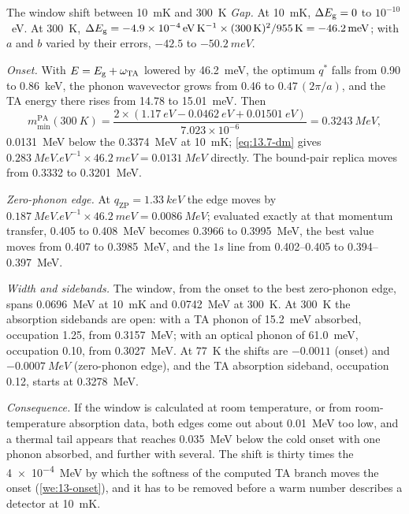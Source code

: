 \begin{workedexample}{The window shift between \SI{10}{mK} and \SI{300}{K}}\label{we:13-windowT}
\emph{Gap.} At \SI{10}{mK}, $\Delta E_{\mathrm{g}} = 0$ to $10^{-10}$~eV. At \SI{300}{K}, $\Delta E_{\mathrm{g}} = -\SI{4.9e-4}{eV.K^{-1}}\times(\SI{300}{K})^2/\SI{955}{K} = -\SI{46.2}{meV}$; with $a$ and $b$ varied by their errors, $-42.5$ to $-\SI{50.2}{meV}$.

\emph{Onset.} With $E = E_{\mathrm{g}} + \omega_{\mathrm{TA}}$ lowered by \SI{46.2}{meV}, the optimum $q^*$ falls from 0.90 to \SI{0.86}{keV}, the phonon wavevector grows from 0.46 to $0.47\,(2\pi/a)$, and the TA energy there rises from 14.78 to \SI{15.01}{meV}. Then
\begin{equation*}
  m_{\mathrm{min}}^{\mathrm{PA}}(\SI{300}{K}) = \frac{2\times(\SI{1.17}{eV} - \SI{0.0462}{eV} + \SI{0.01501}{eV})}{7.023\times10^{-6}} = \SI{0.3243}{MeV} ,
\end{equation*}
\SI{0.0131}{MeV} below the \SI{0.3374}{MeV} at \SI{10}{mK}; \cref{eq:13.7-dm} gives $\SI{0.283}{MeV.eV^{-1}}\times\SI{46.2}{meV} = \SI{0.0131}{MeV}$ directly. The bound-pair replica moves from 0.3332 to \SI{0.3201}{MeV}.

\emph{Zero-phonon edge.} At $q_{\mathrm{ZP}} = \SI{1.33}{keV}$ the edge moves by $\SI{0.187}{MeV.eV^{-1}}\times\SI{46.2}{meV} = \SI{0.0086}{MeV}$; evaluated exactly at that momentum transfer, 0.405 to \SI{0.408}{MeV} becomes 0.3966 to \SI{0.3995}{MeV}, the best value moves from 0.407 to \SI{0.3985}{MeV}, and the $1s$ line from 0.402--0.405 to 0.394--\SI{0.397}{MeV}.

\emph{Width and sidebands.} The window, from the onset to the best zero-phonon edge, spans \SI{0.0696}{MeV} at \SI{10}{mK} and \SI{0.0742}{MeV} at \SI{300}{K}. At \SI{300}{K} the absorption sidebands are open: with a TA phonon of \SI{15.2}{meV} absorbed, occupation 1.25, from \SI{0.3157}{MeV}; with an optical phonon of \SI{61.0}{meV}, occupation 0.10, from \SI{0.3027}{MeV}. At \SI{77}{K} the shifts are $-0.0011$ (onset) and $-\SI{0.0007}{MeV}$ (zero-phonon edge), and the TA absorption sideband, occupation 0.12, starts at \SI{0.3278}{MeV}.

\emph{Consequence.} If the window is calculated at room temperature, or from room-temperature absorption data, both edges come out about \SI{0.01}{MeV} too low, and a thermal tail appears that reaches \SI{0.035}{MeV} below the cold onset with one phonon absorbed, and further with several. The shift is thirty times the \SI{4e-4}{MeV} by which the softness of the computed TA branch moves the onset (\cref{we:13-onset}), and it has to be removed before a warm number describes a detector at \SI{10}{mK}.
\end{workedexample}
